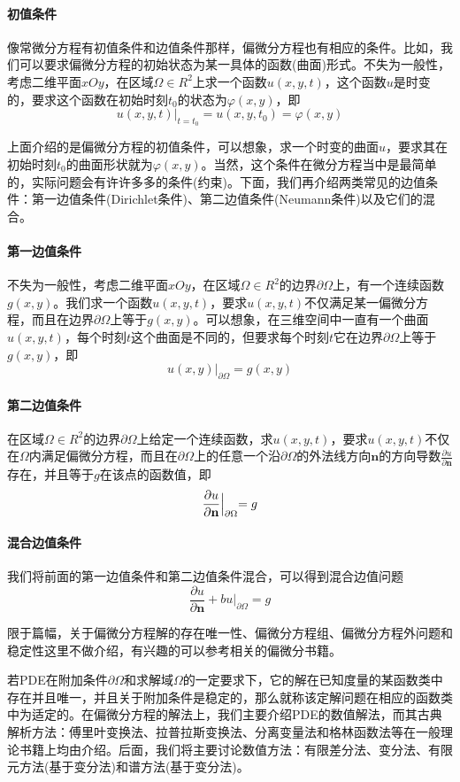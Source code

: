             \paragraph{初值条件}
            像常微分方程有初值条件和边值条件那样，偏微分方程也有相应的条件。比如，我们可以要求偏微分方程的初始状态为某一具体的函数(曲面)形式。不失为一般性，考虑二维平面$xOy$，在区域$\Omega \in R^2$上求一个函数$u(x,y,t)$，这个函数$u$是时变的，要求这个函数在初始时刻$t_0$的状态为$\varphi (x,y)$，即
            \[
                u(x,y,t) \bigl|_{t=t_0} = u(x,y,t_0) = \varphi (x,y)
            \]
            \par
            上面介绍的是偏微分方程的初值条件，可以想象，求一个时变的曲面$u$，要求其在初始时刻$t_0$的曲面形状就为$\varphi (x,y)$。当然，这个条件在微分方程当中是最简单的，实际问题会有许许多多的条件(约束)。下面，我们再介绍两类常见的边值条件：第一边值条件(Dirichlet条件)、第二边值条件(Neumann条件)以及它们的混合。
            \paragraph{第一边值条件}不失为一般性，考虑二维平面$xOy$，在区域$\Omega \in R^2$的边界$\partial \Omega$上，有一个连续函数$g(x,y)$。我们求一个函数$u(x,y,t)$，要求$u(x,y,t)$不仅满足某一偏微分方程，而且在边界$ \partial \Omega$上等于$g(x,y)$。可以想象，在三维空间中一直有一个曲面$u(x,y,t)$，每个时刻$t$这个曲面是不同的，但要求每个时刻$t$它在边界$\partial \Omega$上等于$g(x,y)$，即
            \[
                u(x,y)\bigl|_{\partial \Omega} = g(x,y)
            \]
            \paragraph{第二边值条件}在区域$\Omega \in R^2$的边界$\partial \Omega$上给定一个连续函数，求$u(x,y,t)$，要求$u(x,y,t)$不仅在$\Omega$内满足偏微分方程，而且在$\partial \Omega$上的任意一个沿$\partial \Omega$的外法线方向$\mathbf{n}$的方向导数$\frac{\partial u}{\partial \mathbf{n}}$存在，并且等于$g$在该点的函数值，即
            \[
                \frac{\partial u}{\partial \mathbf{n}} \Bigl|_{\partial \Omega} = g
            \]
            \paragraph{混合边值条件}我们将前面的第一边值条件和第二边值条件混合，可以得到混合边值问题
            \[
                \frac{\partial u}{\partial \mathbf{n}} +b u \bigl|_{\partial \Omega} = g
            \]
    \par
    限于篇幅，关于偏微分方程解的存在唯一性、偏微分方程组、偏微分方程外问题和稳定性这里不做介绍，有兴趣的可以参考相关的偏微分书籍。
    \par
    若PDE在附加条件$\partial \Omega$和求解域$\Omega$的一定要求下，它的解在已知度量的某函数类中存在并且唯一，并且关于附加条件是稳定的，那么就称该定解问题在相应的函数类中为适定的。在偏微分方程的解法上，我们主要介绍PDE的数值解法，而其古典解析方法：傅里叶变换法、拉普拉斯变换法、分离变量法和格林函数法等在一般理论书籍上均由介绍。后面，我们将主要讨论数值方法：有限差分法、变分法、有限元方法(基于变分法)和谱方法(基于变分法)。

